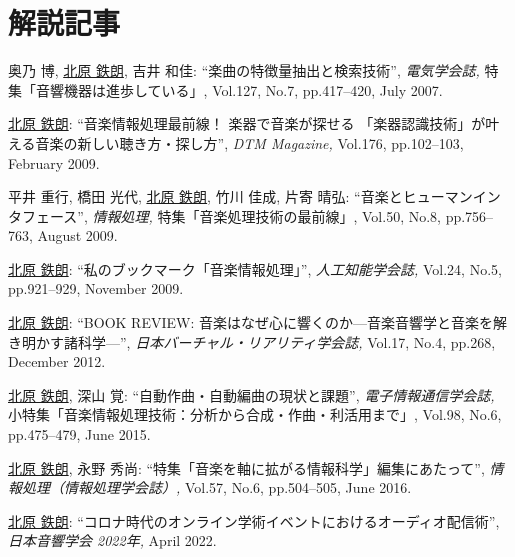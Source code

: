 \section*{解説記事}
\begin{Enumerate}
  
\item 
奥乃 博, 
\underline{北原 鉄朗}, 
吉井 和佳: 
    ``楽曲の特徴量抽出と検索技術'', 
    {\it 電気学会誌,
    } 特集「音響機器は進歩している」, Vol.127, No.7, pp.417--420, July 2007. 

\item 
\underline{北原 鉄朗}: 
    ``音楽情報処理最前線！ 楽器で音楽が探せる 「楽器認識技術」が叶える音楽の新しい聴き方・探し方'', 
    {\it DTM Magazine,
    } Vol.176, pp.102--103, February 2009. 

\item 
平井 重行, 
橋田 光代, 
\underline{北原 鉄朗}, 
竹川 佳成, 
片寄 晴弘: 
    ``音楽とヒューマンインタフェース'', 
    {\it 情報処理,
    } 特集「音楽処理技術の最前線」, Vol.50, No.8, pp.756--763, August 2009. 

\item 
\underline{北原 鉄朗}: 
    ``私のブックマーク「音楽情報処理」'', 
    {\it 人工知能学会誌,
    } Vol.24, No.5, pp.921--929, November 2009. 

\item 
\underline{北原 鉄朗}: 
    ``BOOK REVIEW: 音楽はなぜ心に響くのか---音楽音響学と音楽を解き明かす諸科学---'', 
    {\it 日本バーチャル・リアリティ学会誌,
    } Vol.17, No.4, pp.268, December 2012. 

\item 
\underline{北原 鉄朗}, 
深山 覚: 
    ``自動作曲・自動編曲の現状と課題'', 
    {\it 電子情報通信学会誌,
    } 小特集「音楽情報処理技術：分析から合成・作曲・利活用まで」, Vol.98, No.6, pp.475--479, June 2015. 

\item 
\underline{北原 鉄朗}, 
永野 秀尚: 
    ``特集「音楽を軸に拡がる情報科学」編集にあたって'', 
    {\it 情報処理（情報処理学会誌）,
    } Vol.57, No.6, pp.504--505, June 2016. 

\item 
\underline{北原 鉄朗}: 
    ``コロナ時代のオンライン学術イベントにおけるオーディオ配信術'', 
    {\it 日本音響学会 2022年,
    } April 2022. 

\end{Enumerate}

